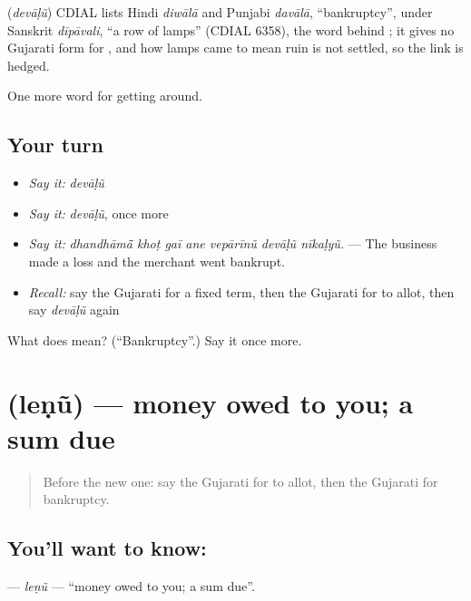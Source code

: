 \begin{cousinweb}
\textbf{} (\emph{devāḷũ}) CDIAL lists Hindi \emph{diwālā} and Punjabi \emph{davālā}, \textquotedblleft{}bankruptcy\textquotedblright{}, under Sanskrit \emph{dīpāvali}, \textquotedblleft{}a row of lamps\textquotedblright{} (CDIAL 6358), the word behind ; it gives no Gujarati form for , and how lamps came to mean ruin is not settled, so the link is hedged.
\end{cousinweb}

\begin{grammarlens}[title={What you've built}]
One more word for getting around.
\end{grammarlens}

\subsection*{Your turn}
\begin{itemize}
\raggedright
  \item \emph{Say it:} \emph{devāḷũ}
  \item \emph{Say it:} \emph{devāḷũ}, once more
  \item \emph{Say it:} \emph{dhandhāmā̃ khoṭ gaī ane vepārīnũ devāḷũ nīkaḷyũ.} — The business made a loss and the merchant went bankrupt.
  \item \emph{Recall:} say the Gujarati for a fixed term, then the Gujarati for to allot, then say \emph{devāḷũ} again
\end{itemize}

\begin{tcolorbox}[breakable,colback=teal!4,colframe=teal!35!black,title={Before you move on}]
What does  mean? (\textquotedblleft{}Bankruptcy\textquotedblright{}.) Say it once more.
\end{tcolorbox}
\section[\texorpdfstring{\gu{લેણું} (leṇũ)}{લેણું (leṇũ)}]{ (leṇũ) — money owed to you; a sum due}

\label{lesson:GU-C428-lenu}



\begin{quote}
Before the new one: say the Gujarati for to allot, then the Gujarati for bankruptcy.
\end{quote}

\subsection*{You'll want to know: }
\textbf{} — \emph{leṇũ} — \textquotedblleft{}money owed to you; a sum due\textquotedblright{}.

